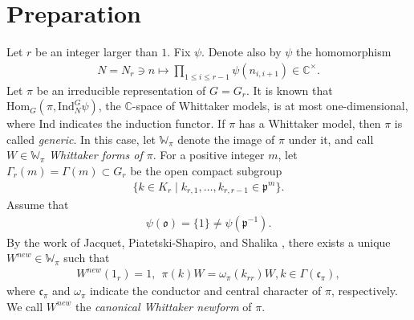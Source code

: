 \documentclass[11pt]{amsart}
\newcommand\w{\omega}
\newcommand\oo{\mathfrak{o}}
\newcommand\p{{\mathfrak{p}}}
\newcommand\cf{{\mathfrak{c}}}
\newcommand\C{{\mathbb{C}}}%
\newcommand\Wb{{\mathbb{W}}}
\newcommand\1{\mathbf{1}}
\newcommand\In{{\mathrm{Ind}}}%
\newcommand\Hom{{\mathrm{Hom}}}%
\newcommand\tm{\times}
\numberwithin{equation}{section}
\begin{document}
\section{Preparation}\label{sec:pre}
Let $r$ be an integer larger than $1$.
Fix $\psi$.
Denote also by $\psi$ the homomorphism
\begin{align}
 N = N_r \ni n \longmapsto \prod_{1 \le i \le r-1} \psi(n_{i,i+1}) \in \C^\tm. \label{eq:psiex}
\end{align} 
Let $\pi$ be an irreducible representation of $G= G_r$.
It is known that $\Hom_{G}(\pi, \In_N^{G} \psi)$, the $\C$-space of Whittaker models, is at most one-dimensional, where $\In$ indicates the induction functor.
If $\pi$ has a Whittaker model,  then $\pi$ is called {\it generic}.
In this case, let $\Wb_\pi$ denote the image of $\pi$ under it, and call $W \in \Wb_\pi$ {\it Whittaker forms of $\pi$}.
For a positive integer $m$, let $\Gamma_r(m) = \Gamma(m) \subset G_r$ be the open compact subgroup 
\begin{align}
\{k \in K_r \mid k_{r,1}, \ldots,  k_{r,r-1} \in \p^{m} \}. \label{def:Gc}
\end{align} 
Assume that 
\begin{align}
\psi(\oo) = \{1\} \neq \psi(\p^{-1})  \label{ass:psi}.
\end{align}
By the work of Jacquet, Piatetski-Shapiro, and Shalika \cite{JPSS}, there exists a unique $W^{new} \in \Wb_\pi$ such that 
\begin{align*}
W^{new}(1_r) = 1, \ \ \pi(k) W = \w_\pi(k_{rr})W, k \in \Gamma(\cf_\pi),
\end{align*} 
where $\cf_\pi$ and $\w_\pi$ indicate the conductor and central character of $\pi$, respectively. 
We call $W^{new}$ the {\it canonical Whittaker newform} of $\pi$.
\end{document}
